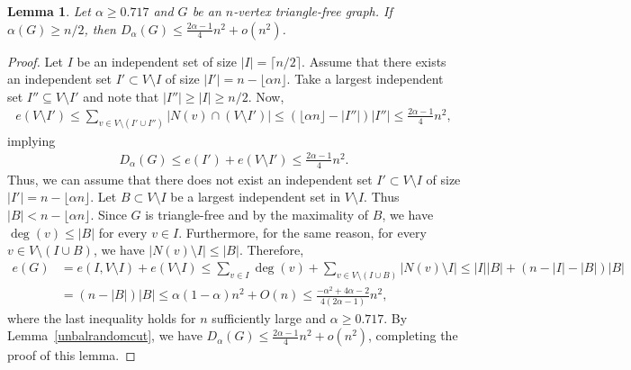 \documentclass[11pt]{article}
\newtheorem{lemma}[theo]{Lemma}
\theoremstyle{definition}
\numberwithin{theo}{section}
\begin{document}
\begin{lemma}
\label{unbalanindep}
Let $\alpha\geq 0.717$ and $G$ be an $n$-vertex triangle-free graph. If $\alpha(G)\geq n/2$, then 
$D_\alpha(G)\leq \frac{2\alpha-1}{4}n^2+o(n^2)$.
\end{lemma}
\begin{proof}
Let $I$ be an independent set of size $|I|=\lceil n/2\rceil$. Assume that there exists an independent set $I'\subset V\setminus I$ of size $|I'|=n-\lfloor\alpha n \rfloor$. Take a largest independent set $I''\subseteq V\setminus I'$ and note that $|I''|\geq|I|\geq n/2$. Now,
\begin{align*}
    e(V\setminus I')\leq \sum_{v\in V\setminus (I'\cup I'')}|N(v)\cap(V\setminus I')|\leq (\lfloor\alpha n\rfloor -|I''|)|I''|\leq \frac{2\alpha-1}{4}n^2,
\end{align*}
implying
\begin{align*}
    D_\alpha(G)\leq e(I')+e(V\setminus I')\leq\frac{2\alpha-1}{4}n^2.
\end{align*}
Thus, we can assume that there does not exist an independent set $I'\subset V\setminus I$ of size $|I'|=n-\lfloor \alpha n\rfloor$. Let $B\subset V\setminus I$ be a largest independent set in $V\setminus I$. Thus $|B|<n-\lfloor \alpha n\rfloor$. 
Since $G$ is triangle-free and by the maximality of $B$, we have $\deg(v)\leq |B|$ for every $v\in I$. Furthermore, for the same reason, for every $v\in V\setminus (I\cup B)$, we have $|N(v)\setminus I|\leq |B|$. Therefore, \begin{align*}
    e(G)&=e(I,V\setminus I)+e(V\setminus I)\leq\sum_{v\in I}\deg(v)+\sum_{v\in V\setminus(I\cup B)}|N(v)\setminus I|\leq |I||B|+(n-|I|-|B|)|B|\\
    &=(n-|B|)|B|
    \leq \alpha (1-\alpha)n^2+O(n)\leq \frac{-\alpha^2+4\alpha-2}{4(2\alpha-1)}n^2,
\end{align*}
where the last inequality holds for $n$ sufficiently large and $\alpha\geq 0.717$. By Lemma~\ref{unbalrandomcut}, we have $D_\alpha(G)\leq \frac{2\alpha- 1}{4}n^2+o(n^2)$, completing the proof of this lemma.
\end{proof}
\end{document}
